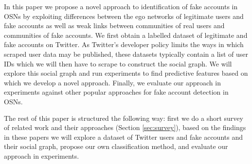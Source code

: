 

In this paper we propose a novel approach to identification of fake accounts in OSNs by exploiting differences between the ego networks of legitimate users and fake accounts as well as weak links between communities of real users and communities of fake accounts. We first obtain a labelled dataset of legitimate and fake accounts on Twitter. As Twitter's developer policy limits the ways in which scraped user data may be published, these datasets typically contain a list of user IDs which we will then have to scrape to construct the social graph. We will explore this social graph and run experiments to find predictive features based on which we develop a novel approach. Finally, we evaluate our approach in experiments against other popular approaches for fake account detection in OSNs.

The rest of this paper is structured the following way: first we do a short survey of related work and their approaches (Section \ref{sec:survey}), based on the findings in these papers we will explore a dataset of Twitter users and fake accounts and their social graph, propose our own classification method, and evaluate our approach in experiments.
